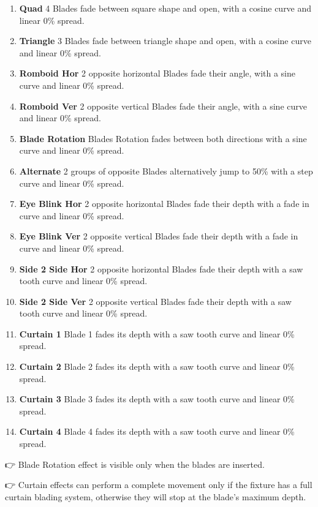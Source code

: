 \documentclass[
]{article}
\begin{document}
\begin{itemize}
  \begin{enumerate}
  \def\labelenumi{\arabic{enumi}.}
  \item
    \textbf{Quad} 4 Blades fade between square shape and open, with a cosine curve and linear 0\% spread.
  \item
    \textbf{Triangle} 3 Blades fade between triangle shape and open, with a cosine curve and linear 0\% spread.
  \item
    \textbf{Romboid Hor} 2 opposite horizontal Blades fade their angle, with a sine curve and linear 0\% spread.
  \item
    \textbf{Romboid Ver} 2 opposite vertical Blades fade their angle, with a sine curve and linear 0\% spread.
  \item
    \textbf{Blade Rotation} Blades Rotation fades between both directions with a sine curve and linear 0\% spread.
  \item
    \textbf{Alternate} 2 groups of opposite Blades alternatively jump to 50\% with a step curve and linear 0\% spread.
  \item
    \textbf{Eye Blink Hor} 2 opposite horizontal Blades fade their depth with a fade in curve and linear 0\% spread.
  \item
    \textbf{Eye Blink Ver} 2 opposite vertical Blades fade their depth with a fade in curve and linear 0\% spread.
  \item
    \textbf{Side 2 Side Hor} 2 opposite horizontal Blades fade their depth with a saw tooth curve and linear 0\% spread.
  \item
    \textbf{Side 2 Side Ver} 2 opposite vertical Blades fade their depth with a saw tooth curve and linear 0\% spread.
  \item
    \textbf{Curtain 1} Blade 1 fades its depth with a saw tooth curve and linear 0\% spread.
  \item
    \textbf{Curtain 2} Blade 2 fades its depth with a saw tooth curve and linear 0\% spread.
  \item
    \textbf{Curtain 3} Blade 3 fades its depth with a saw tooth curve and linear 0\% spread.
  \item
    \textbf{Curtain 4} Blade 4 fades its depth with a saw tooth curve and linear 0\% spread.
  \end{enumerate}

  👉 Blade Rotation effect is visible only when the blades are inserted.

  👉 Curtain effects can perform a complete movement only if the fixture has a full curtain blading system, otherwise they will stop at the blade's maximum depth.
\end{itemize}
\end{document}
